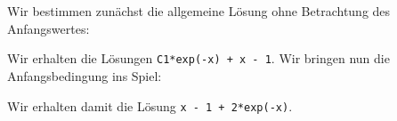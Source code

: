 \section{}

Wir bestimmen zunächst die allgemeine Lösung ohne Betrachtung des Anfangswertes:



Wir erhalten die Lösungen \texttt{C1*exp(-x) + x - 1}.
Wir bringen nun die Anfangsbedingung ins Spiel:



Wir erhalten damit die Lösung \texttt{x - 1 + 2*exp(-x)}.
